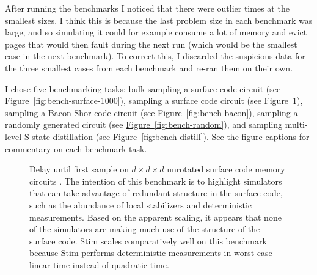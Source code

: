 \documentclass[onecolumn,unpublished]{quantumarticle}
\theoremstyle{definition}
\theoremstyle{definition}
\theoremstyle{definition}
\newcommand{\fig}[1]{\hyperref[fig:#1]{Figure~\ref*{fig:#1}}}
\begin{document}
After running the benchmarks I noticed that there were outlier times at the smallest sizes.
I think this is because the last problem size in each benchmark was large, and so simulating it could for example consume a lot of memory and evict pages that would then fault during the next run (which would be the smallest case in the next benchmark).
To correct this, I discarded the suspicious data for the three smallest cases from each benchmark and re-ran them on their own.

I chose five benchmarking tasks: bulk sampling a surface code circuit (see \fig{bench-surface-1000}), sampling a surface code circuit (see \fig{bench-surface}), sampling a Bacon-Shor code circuit (see \fig{bench-bacon}), sampling a randomly generated circuit (see \fig{bench-random}), and sampling multi-level S state distillation (see \fig{bench-distill}).
See the figure captions for commentary on each benchmark task.

\begin{figure}
    \centering
    \caption{
        Delay until first sample on $d \times d \times d$ unrotated surface code memory circuits \cite{horsman2012latticesurgery}.
        The intention of this benchmark is to highlight simulators that can take advantage of redundant structure in the surface code, such as the abundance of local stabilizers and deterministic measurements.
        Based on the apparent scaling, it appears that none of the simulators are making much use of the structure of the surface code.
        Stim scales comparatively well on this benchmark because Stim performs deterministic measurements in worst case linear time instead of quadratic time.
    }
    \label{fig:bench-surface}
\end{figure}
\end{document}
